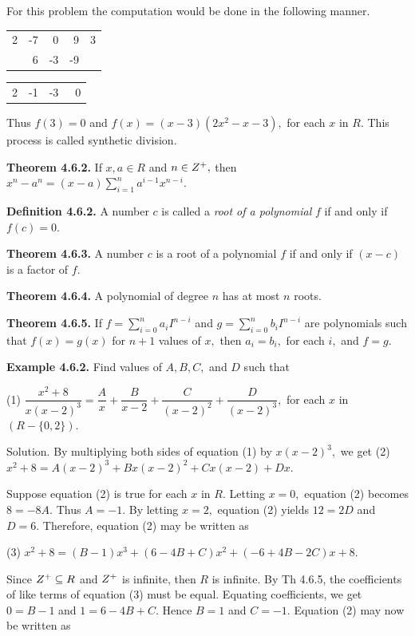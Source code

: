 For this problem the computation would be done in the following manner.\nl

\begin{tabular}{rrrr|l}
2&-7&0&9&3\\
&6&-3&-9&\\
\end{tabular}\nl
\begin{tabular}{rrrl}\hline
2&-1&-3&~0
\end{tabular}

Thus $f(3) = 0$ and $f(x) = (x - 3)(2x^{2} - x - 3),$ for each $x$ in $R.$  This process is called synthetic division.\nl

\newpage

\textbf{Theorem 4.6.2.}  If $x,a\in R$ and $n\in Z^{+},$ then $x^{n} - a^{n} = (x - a)\sum\limits_{i=1}^{n}a^{i-1}x^{n-i}.$\nl

\textbf{Definition 4.6.2.} A number $c$ is called a \textit{root of a polynomial} $f$ if
and only if $f(c) = 0.$\nl

\textbf{Theorem 4.6.3.} A number $c$ is a root of a polynomial $f$ if and only if $(x - c)$ is a factor of $f.$\nl

\textbf{Theorem 4.6.4.} A polynomial of degree $n$ has at most $n$ roots. \nl

\textbf{Theorem 4.6.5.} If $f= \sum\limits_{i=0}^{n}a_{i}I^{n-i}$ and $g= \sum\limits_{i=0}^{n}b_{i}I^{n-i}$ are polynomials such that $f(x) = g(x)$ for $n + 1$ values of $x,$ then $a_{i} =b_{i},$ for each $i,$ and $f = g.$\nl

\textbf{Example 4.6.2.} Find values of $A, B, C,$ and $D$ such that


(1) $\dfrac{x^{2} + 8}{x(x - 2)^{3}} = \dfrac{A}{x} + \dfrac{B}{x - 2} + \dfrac{C}{(x - 2)^{2}} + \dfrac{D}{(x - 2)^{3}},$\nl
for each $x$ in $(R-\{ 0, 2\}).$\nl

Solution. By multiplying both sides of equation (1) by $x(x-2)^{3},$ we get \nl
(2) $x^{2} + 8 = A(x - 2)^{3} + Bx(x - 2)^{2} + Cx(x - 2) +Dx.$\nl

Suppose equation (2) is true for each $x$ in $R.$ Letting $x = 0,$ equation (2) becomes $8 = -8A.$ Thus $A = -1.$ By letting $x = 2,$ equation (2) yields $12 =2D$ and $D = 6.$ Therefore, equation (2) may be written as \nl

(3) $x^{2} + 8= (B-1)x^{3} + (6 - 4B + C)x^{2} + (-6 + 4B -2C)x + 8.$\nl

Since $Z^{+} \subseteq R$ and $Z^{+}$ is infinite, then $R$ is infinite. By Th 4.6.5, the coef­ficients of
like terms of equation (3) must be equal. Equating coefficients, we get $0 = B - 1$ and $1=6 -4B + C.$ Hence $B = 1$ and $C = -1.$ Equation (2) may now be written as \nl

